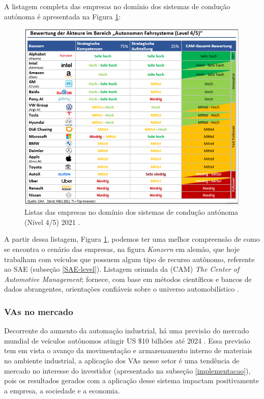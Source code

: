 A listagem completa das empresas no domínio dos sistemas de condução autónoma é apresentada na Figura \ref{figura_companies}:


\begin{figure}[H]
\centering
\includegraphics[width=16cm]{Figures/grafik.png}
\caption{Listas das empresas no domínio dos sistemas de condução autónoma (Nível 4/5) 2021 \cite{CAM}.}
\label{figura_companies}
\end{figure}

A partir dessa listagem, Figura \ref{figura_companies}, podemos ter uma melhor compreensão de como se encontra o cenário das empresas, na figura \textit{Konzern} em alemão, que hoje trabalham com veículos que possuem algum tipo de recurso autônomo, referente ao SAE (subseção \ref{SAE-level}). Listagem oriunda da (CAM) \textit{The Center of Automotive Management}; fornece, com base em métodos científicos e bancos de dados abrangentes, orientações confiáveis sobre o universo automobilístico \cite{CAM}.

\subsubsection{VAs no mercado}

Decorrente do aumento da automação industrial, há uma previsão do mercado mundial de veículos autônomos atingir US \$10 bilhões até 2024 \cite{mercadoo}. Essa previsão tem em vista o avanço da movimentação e armazenamento interno de materiais no ambiente industrial, a aplicação dos VAs nesse setor é uma tendência de mercado no interesse do investidor (apresentado na subseção \ref{implementacao}), pois os resultados gerados com a aplicação desse sistema impactam positivamente a empresa, a sociedade e a economia.

